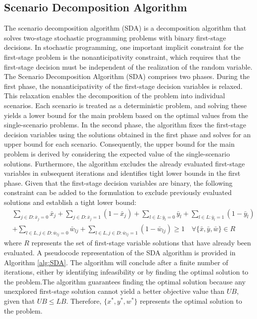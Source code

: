\documentclass[preprint,review,11pt,authoryear]{elsarticle}
\begin{document}
\subsection{Scenario Decomposition Algorithm} \label{subsec:SDA}
The scenario decomposition algorithm (SDA) is a decomposition algorithm that solves two-stage stochastic programming problems with binary first-stage decisions. In stochastic programming, one important implicit constraint for the first-stage problem is the nonanticipativity constraint, which requires that the first-stage decision must be independent of the realization of the random variable. The Scenario Decomposition Algorithm (SDA) comprises two phases. During the first phase, the nonanticipativity of the first-stage decision variables is relaxed. This relaxation enables the decomposition of the problem into individual scenarios. Each scenario is treated as a deterministic problem, and solving these yields a lower bound for the main problem based on the optimal values from the single-scenario problems. In the second phase, the algorithm fixes the first-stage decision variables using the solutions obtained in the first phase and solves for an upper bound for each scenario. Consequently, the upper bound for the main problem is derived by considering the expected value of the single-scenario solutions. Furthermore, the algorithm excludes the already evaluated first-stage variables in subsequent iterations and identifies tight lower bounds in the first phase. Given that the first-stage decision variables are binary, the following constraint can be added to the formulation to exclude previously evaluated solutions and establish a tight lower bound:
\begin{subequations} 
    \begin{align*}
        & \sum_{j \in D: \bar{x}_j = 0} \bar{x}_j + \sum_{j \in D: \bar{x}_j = 1} (1 - \bar{x}_j) + \sum_{l \in L: \bar{y}_l = 0} \bar{y}_l + \sum_{l \in L: \bar{y}_l = 1} (1 - \bar{y}_l) \\ \label{constraint:remove_tested_sol} \tag{7}
        & + \sum_{l \in L, j \in D: \bar{w}_{lj} = 0} \bar{w}_{lj} + \sum_{l \in L, j \in D: \bar{w}_{lj} = 1} (1 - \bar{w}_{lj}) \geq 1 \quad \forall \{\bar{x}, \bar{y}, \bar{w}\} \in R
    \end{align*}
\end{subequations}
where $R$ represents the set of first-stage variable solutions that have already been evaluated. A pseudocode representation of the SDA algorithm is provided in Algorithm \ref{alg:SDA}. The algorithm will conclude after a finite number of iterations, either by identifying infeasibility or by finding the optimal solution to the problem.The algorithm guarantees finding the optimal solution because any unexplored first-stage solution cannot yield a better objective value than $UB$, given that $UB \leq LB$. Therefore, $\{x^*, y^*, w^*\}$ represents the optimal solution to the problem.
\end{document}
